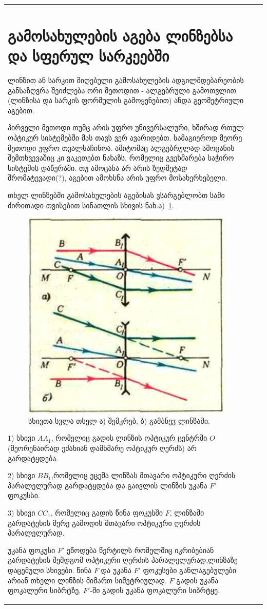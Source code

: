 \documentclass{book}
\begin{document}
\begin{tabular}{|l|c|c|}
\section{გამოსახულების აგება ლინზებსა და სფერულ სარკეებში}
ლინზით ან სარკით მიღებული გამოსახულების ადგილმდებარეობის განსაზღვრა შეიძლება ორი მეთოდით - ალგებრული გამოთვლით (ლინზისა და სარკის ფორმულის გამოყენებით) ანდა გეომეტრიული აგებით.

პირველი მეთოდი თუმც არის უფრო უნივერსალური, ხშირად რთულ ოპტიკურ სისტემებში მას თავს ვერ ავარიდებთ. სამაგიეროდ მეორე მეთოდი უფრო თვალსაჩინოა. ამიტომაც ალგებრულად ამოცანის შემთხვევაშიც კი ვაკეთებთ ნახაზს, რომელიც გვეხმარება საჭირო სისტემის დაწერაში. თუ ამოცანა არ არის ზედმეტად შრომატევადი(?), აგებით ამოხსნა არის უფრო მოსახერხებელი.

თხელ ლინზებში გამოსახულების აგებისას ვსარგებლობთ სამი ძირითადი თვისებით სინათლის სხივის ნახ.ა)~\ref{fig:optics_1}.
		\begin{figure}[h]
		   \centering
           \includegraphics[width=0.5\columnwidth]{figures/optics_1}
           \caption{სხივთა სვლა თხელ ა) შემკრებ, ბ) გამბნევ ლინზაში.}
           \label{fig:optics_1}
        \end{figure}

1) სხივი $AA_1$, რომელიც გადის ლინზის ოპტიკურ ცენტრში $O$ (მეორენაირად ეძახიან დამხმარე ოპტიკურ ღერძს) არ გარდატყდება.

2) სხივი $BB_1$,რომელიც ეცემა ლინზას მთავარი ოპტიკური ღერძის პარალელურად გარდატყდება და გაივლის ლინზის უკანა $F'$ ფოკუსსი.

3) სხივი $CC_1$, რომელიც გადის წინა ფოკუსში $F$, ლინზაში გარდატეხის მერე გამოდის მთავარი ოპტიკური ღერძის პარალელურად.

უკანა ფოკუსი $F'$ ეწოდება წერტილს რომელშიც იკრიბებიან გარდატეხის შემდგომ ოპტიკური ღერძის პარალელურად,ლინზაზე დაცემული სხივები. წინა $F$ და უკანა $F'$ ფოკუსები განლაგებულები არიან თხელი ლინზის მიმართ სიმეტრიულად. $F$ გადის უკანა ფოკალური სიბრტზე, $F'$-ში გადის უკანა ფოკალური სიბრტყე.


\end{tabular}
\end{document}
